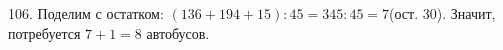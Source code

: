 106. Поделим с остатком: $(136+194+15):45=345:45=7$(ост. 30). Значит, потребуется $7+1=8$ автобусов.\\
